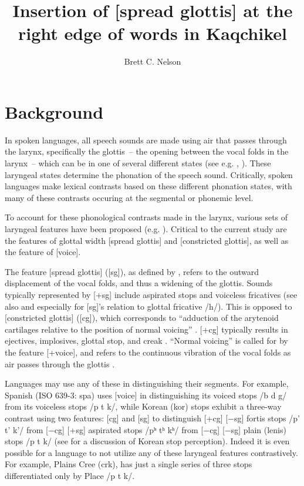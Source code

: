 \documentclass[output=paper,colorlinks,citecolor=brown]{langscibook}
\author{Brett C. Nelson\affiliation{University of Calgary}\orcid{0000-0001-6665-7193}}
\title{Insertion of [spread glottis] at the right edge of words in Kaqchikel}
\begin{document}
\maketitle \label{ch13}

\section{Background}\label{Background}
In spoken languages, all speech sounds are made using air that passes through the larynx, specifically the glottis~-- the opening between the vocal folds in the larynx~-- which can be in one of several different states (see e.g. \citealt{ladefoged_1971}, \citealt{ladefoged_1983}). These laryngeal states determine the phonation of the speech sound. Critically, spoken languages make lexical contrasts based on these different phonation states, with many of these contrasts occuring at the segmental or phonemic level.

To account for these phonological contrasts made in the larynx, various sets of laryngeal features have been proposed (e.g. \citealt{halle_stevens_1971, clements_1985, lombardi_1994, iverson_salmons_2007}). Critical to the current study are the features of glottal width [spread glottis] and [constricted glottis], as well as the feature of [voice].

The feature [spread glottis] ([sg]), as defined by \citet{halle_stevens_1971}, refers to the outward displacement of the vocal folds, and thus a widening of the glottis. Sounds typically represented by [+sg] include aspirated stops and voiceless fricatives \citet{vaux_1998} (see also \citealt{ridouane_2006} and especially \citealt{avery_idsardi_2001} for [sg]’s relation to glottal fricative /h/). This is opposed to [constricted glottis] ([cg]), which corresponds to “adduction of the arytenoid cartilages relative to the position of normal voicing” \citep[201--202]{halle_stevens_1971}. [+cg] typically results in ejectives, implosives, glottal stop, and creak \citep{fallon_2002}. “Normal voicing” is called for by the feature [+voice], and refers to the continuous vibration of the vocal folds as air passes through the glottis \citep{lombardi_1994}. 

Languages may use any of these in distinguishing their segments. For example, Spanish (ISO 639-3: spa) uses [voice] in distinguishing its voiced stops /b d g/ from its voiceless stops /p t k/, while Korean (kor) stops exhibit a three-way contrast using two features: [cg] and [sg] to distinguish [+cg] [−sg] fortis stops /p’ t’ k’/ from [−cg] [+sg] aspirated stops /pʰ tʰ kʰ/ from [−cg] [−sg] plain (lenis) stops /p t k/ (see  for a discussion of Korean stop perception). Indeed it is even possible for a language to not utilize any of these laryngeal features contrastively. For example, Plains Cree (crk), has just a single series of three stops differentiated only by Place /p t k/.
\end{document}
